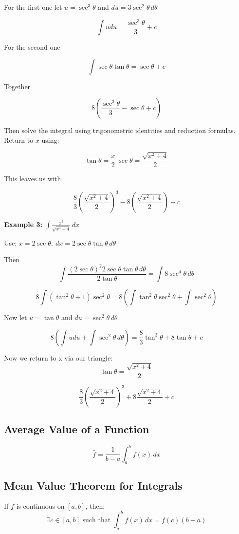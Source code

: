 For the first one let \(u = \sec^3\theta\) and \(du = 3\sec^2\theta\,d\theta\) 

\[
\int udu = \frac{\sec^3\theta}{3} + c
\]

For the second one

\[
\int \sec\theta\tan\theta = \sec\theta + c
\]

Together

\[8\left(  \frac{\sec^3\theta}{3} - \sec\theta + c\right)\]

Then solve the integral using trigonometric identities and reduction formulas. Return to \( x \) using:

\[
\tan\theta = \frac{x}{2}\ \sec\theta = \frac{\sqrt{x^2 + 4}}{2}
\]

This leaves us with

\[
    \frac{8}{3} \left(\frac{\sqrt{x^2 + 4}}{2}\right)^3 - 8 \left( \frac{\sqrt{x^2 + 4}}{2}\right) + c
\]

\textbf{Example 3: \( \int \frac{x^3}{\sqrt{x^4 - 4}} \,dx \)}

Use: \(x = 2\sec \theta, \ dx = 2\sec \theta \tan \theta \,d\theta \)

Then
\[
\int \frac{(2\sec\theta)^2 2\sec\theta \tan\theta \,d\theta}{2\tan\theta} = \int 8\sec^4 \theta\,d\theta
\]

\[
8\int(\tan^2\theta + 1)\sec^2\theta = 8\left(\int\tan^2\theta\sec^2\theta + \int \sec^2\theta \right)
\]

Now let \(u = \tan\theta\) and \(du = \sec^2\theta \,d\theta\)

\[
8\left( \int udu  + \int \sec^2\theta\,d\theta\right) = 
\frac{8}{3}\tan^3\theta + 8\tan\theta + c
\]

Now we return to x via our triangle:
\[\tan\theta = \frac{\sqrt{x^2 + 4}}{2}\]

\[
\frac{8}{3}\left(\frac{\sqrt{x^2 + 4}}{2}\right)^3 + 8 \frac{\sqrt{x^2 + 4}}{2} + c
\]
\subsection{Average Value of a Function}

\[
\bar{f} = \frac{1}{b - a} \int_a^b f(x)\,dx
\]

\subsection{Mean Value Theorem for Integrals}

If \(f\) is continuous on \([a, b]\), then:
\[
\exists c \in [a, b] \text{ such that } \int_a^b f(x)\,dx = f(c)(b - a)
\]

